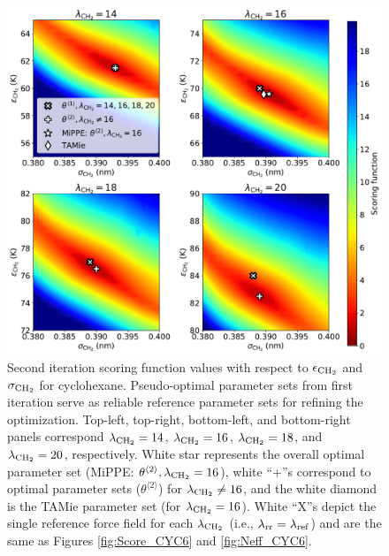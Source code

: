 \documentclass[journal=jced,manuscript=article]{achemso}
\begin{document}

	\begin{figure}[htb!]
		\centering
		\includegraphics[width=6.4in]{CYC6_scoring_function_lam_iteration.pdf}
		\caption{Second iteration scoring function values with respect to $\epsilon_{\rm CH_2}$ and $\sigma_{\rm CH_2}$ for cyclohexane. Pseudo-optimal parameter sets from first iteration serve as reliable reference parameter sets for refining the optimization. Top-left, top-right, bottom-left, and bottom-right panels correspond $\lambda_{\rm CH_2} = 14$, $\lambda_{\rm CH_2} = 16$, $\lambda_{\rm CH_2} = 18$, and $\lambda_{\rm CH_2} = 20$, respectively. White star represents the overall optimal parameter set (MiPPE: $\theta^{\langle2\rangle}, \lambda_{\rm CH_2} = 16$), white ``+''s correspond to optimal parameter sets ($\theta^{\langle2\rangle}$) for $\lambda_{\rm CH_2} \neq 16$, and the white diamond is the TAMie parameter set (for $\lambda_{\rm CH_2} = 16$). White ``X''s depict the single reference force field for each $\lambda_{\rm CH_2}$ (i.e., $\lambda_{\rm rr} = \lambda_{\rm ref}$) and are the same as Figures \ref{fig:Score_CYC6} and \ref{fig:Neff_CYC6}.} %
		\label{fig:Iterate_Score_CYC6}
	\end{figure} 
\end{document}
